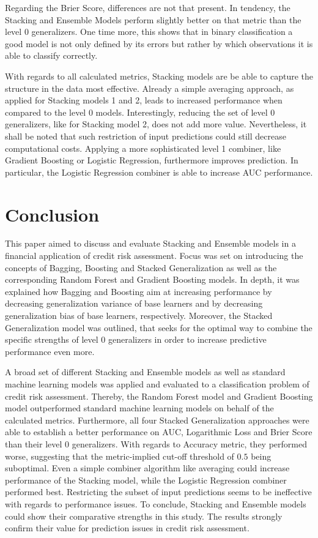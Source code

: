 \documentclass[12pt]{article}
\begin{document}
Regarding the Brier Score, differences are not that present. In tendency, the Stacking and Ensemble Models perform slightly better on that metric than the level 0 generalizers. One time more, this shows that in binary classification a good model is not only defined by its errors but rather by which observations it is able to classify correctly.

With regards to all calculated metrics, Stacking models are be able to capture the structure in the data most effective. Already a simple averaging approach, as applied for Stacking models 1 and 2, leads to increased performance when compared to the level 0 models. Interestingly, reducing the set of level 0 generalizers, like for Stacking model 2, does not add more value. Nevertheless, it shall be noted that such restriction of input predictions could still decrease computational costs. Applying a more sophisticated level 1 combiner, like Gradient Boosting or Logistic Regression, furthermore improves prediction. In particular, the Logistic Regression combiner is able to increase AUC performance. 


\newpage
\section{Conclusion}
This paper aimed to discuss and evaluate Stacking and Ensemble models in a financial application of credit risk assessment. Focus was set on introducing the concepts of Bagging, Boosting and Stacked Generalization as well as the corresponding Random Forest and Gradient Boosting models. In depth, it was explained how Bagging and Boosting aim at increasing performance by decreasing generalization variance of base learners and by decreasing generalization bias of base learners, respectively. Moreover, the Stacked Generalization model was outlined, that seeks for the optimal way to combine the specific strengths of level 0 generalizers in order to increase predictive performance even more.

A broad set of different Stacking and Ensemble models as well as standard machine learning models was applied and evaluated to a classification problem of credit risk assessment. Thereby, the Random Forest model and Gradient Boosting model outperformed standard machine learning models on behalf of the calculated metrics. Furthermore, all four Stacked Generalization approaches were able to establish a better performance on AUC, Logarithmic Loss and Brier Score than their level 0 generalizers. With regards to Accuracy metric, they performed worse, suggesting that the metric-implied cut-off threshold of $0.5$ being suboptimal. Even a simple combiner algorithm like averaging could increase performance of the Stacking model, while the Logistic Regression combiner performed best. Restricting the subset of input predictions seems to be ineffective with regards to performance issues. To conclude, Stacking and Ensemble models could show their comparative strengths in this study. The results strongly confirm their value for prediction issues in credit risk assessment.
\end{document}
